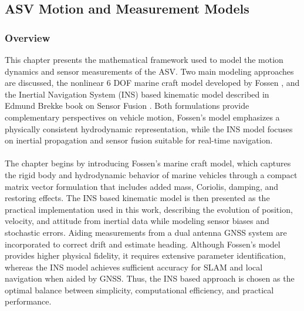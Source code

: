 \subsection{ASV Motion and Measurement Models}
\subsubsection{Overview}
This chapter presents the mathematical framework used to model the motion dynamics and sensor measurements of the ASV. Two main modeling approaches are discussed, the nonlinear 6 DOF marine craft model developed by Fossen \cite{fossen_marine_craft_model}, and the Inertial Navigation System (INS) based kinematic model described in Edmund Brekke book on Sensor Fusion \cite{sensor_fusion_book}. Both formulations provide complementary perspectives on vehicle motion, Fossen's model emphasizes a physically consistent hydrodynamic representation, while the INS model focuses on inertial propagation and sensor fusion suitable for real-time navigation.  
\\ \\
The chapter begins by introducing Fossen's marine craft model, which captures the rigid body and hydrodynamic behavior of marine vehicles through a compact matrix vector formulation that includes added mass, Coriolis, damping, and restoring effects. The INS based kinematic model is then presented as the practical implementation used in this work, describing the evolution of position, velocity, and attitude from inertial data while modeling sensor biases and stochastic errors. Aiding measurements from a dual antenna GNSS system are incorporated to correct drift and estimate heading. Although Fossen's model provides higher physical fidelity, it requires extensive parameter identification, whereas the INS model achieves sufficient accuracy for SLAM and local navigation when aided by GNSS. Thus, the INS based approach is chosen as the optimal balance between simplicity, computational efficiency, and practical performance.



